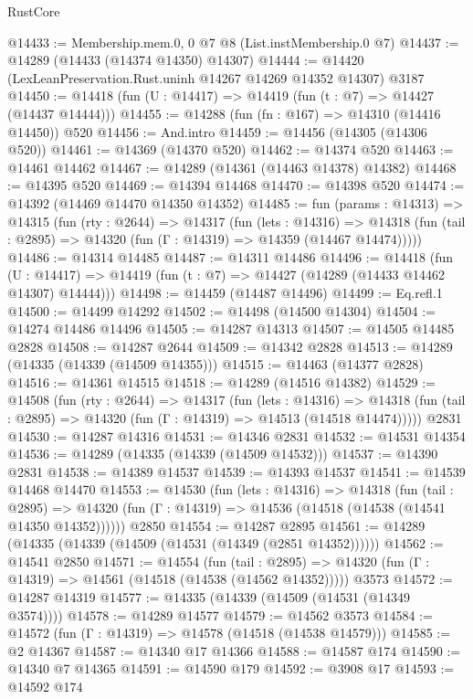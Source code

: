 \begin{lexlean}{RustCore}
\begin{coremodule}
@14433 := Membership.mem.{0, 0} @7 @8 (List.instMembership.{0} @7)
@14437 := @14289 (@14433 (@14374 @14350) @14307)
@14444 := @14420 (LexLeanPreservation.Rust.uninh @14267 @14269 @14352 @14307) @3187
@14450 := @14418 (fun (U : @14417) => @14419 (fun (t : @7) => @14427 (@14437 @14444)))
@14455 := @14288 (fun (fn : @167) => @14310 (@14416 @14450)) @520
@14456 := And.intro
@14459 := @14456 (@14305 (@14306 @520))
@14461 := @14369 (@14370 @520)
@14462 := @14374 @520
@14463 := @14461 @14462
@14467 := @14289 (@14361 (@14463 @14378) @14382)
@14468 := @14395 @520
@14469 := @14394 @14468
@14470 := @14398 @520
@14474 := @14392 (@14469 @14470 @14350 @14352)
@14485 := fun (params : @14313) =>
  @14315
    (fun (rty : @2644) =>
    @14317
      (fun (lets : @14316) =>
      @14318 (fun (tail : @2895) => @14320 (fun (Γ : @14319) => @14359 (@14467 @14474)))))
@14486 := @14314 @14485
@14487 := @14311 @14486
@14496 := @14418
    (fun (U : @14417) => @14419 (fun (t : @7) => @14427 (@14289 (@14433 @14462 @14307) @14444)))
@14498 := @14459 (@14487 @14496)
@14499 := Eq.refl.{1}
@14500 := @14499 @14292
@14502 := @14498 (@14500 @14304)
@14504 := @14274 @14486 @14496
@14505 := @14287 @14313
@14507 := @14505 @14485 @2828
@14508 := @14287 @2644
@14509 := @14342 @2828
@14513 := @14289 (@14335 (@14339 (@14509 @14355)))
@14515 := @14463 (@14377 @2828)
@14516 := @14361 @14515
@14518 := @14289 (@14516 @14382)
@14529 := @14508
    (fun (rty : @2644) =>
    @14317
      (fun (lets : @14316) =>
      @14318 (fun (tail : @2895) => @14320 (fun (Γ : @14319) => @14513 (@14518 @14474)))))
    @2831
@14530 := @14287 @14316
@14531 := @14346 @2831
@14532 := @14531 @14354
@14536 := @14289 (@14335 (@14339 (@14509 @14532)))
@14537 := @14390 @2831
@14538 := @14389 @14537
@14539 := @14393 @14537
@14541 := @14539 @14468 @14470
@14553 := @14530
    (fun (lets : @14316) =>
    @14318
      (fun (tail : @2895) =>
      @14320 (fun (Γ : @14319) => @14536 (@14518 (@14538 (@14541 @14350 @14352))))))
    @2850
@14554 := @14287 @2895
@14561 := @14289 (@14335 (@14339 (@14509 (@14531 (@14349 (@2851 @14352))))))
@14562 := @14541 @2850
@14571 := @14554
    (fun (tail : @2895) => @14320 (fun (Γ : @14319) => @14561 (@14518 (@14538 (@14562 @14352)))))
    @3573
@14572 := @14287 @14319
@14577 := @14335 (@14339 (@14509 (@14531 (@14349 @3574))))
@14578 := @14289 @14577
@14579 := @14562 @3573
@14584 := @14572 (fun (Γ : @14319) => @14578 (@14518 (@14538 @14579)))
@14585 := @2 @14367
@14587 := @14340 @17 @14366
@14588 := @14587 @174
@14590 := @14340 @7 @14365
@14591 := @14590 @179
@14592 := @3908 @17
@14593 := @14592 @174

\end{coremodule}
\end{lexlean}
